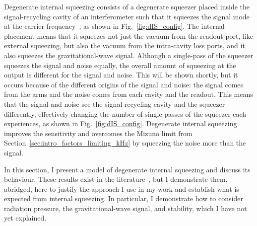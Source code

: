 Degenerate internal squeezing consists of a degenerate squeezer placed inside the signal-recycling cavity of an interferometer such that it squeezes the signal mode at the carrier frequency~\cite{}, as shown in Fig.~\ref{fig:dIS_config}. The internal placement means that it squeezes not just the vacuum from the readout port, like external squeezing, but also the vacuum from the intra-cavity loss ports, and it also squeezes the gravitational-wave signal. Although a single-pass of the squeezer squeezes the signal and noise equally, %
the overall amount of squeezing at the output is different for the signal and noise. This will be shown shortly, but it occurs because of the different origins of the signal and noise: the signal comes from the arms and the noise comes from each cavity and the readout. This means that the signal and noise see  the signal-recycling cavity and the squeezer differently, effectively changing the number of single-passes of the squeezer each experiences, as shown in Fig.~\ref{fig:dIS_config}. 
Degenerate internal squeezing improves the sensitivity and overcomes the Mizuno limit from Section~\ref{sec:intro_factors_limiting_kHz} by squeezing the noise more than the signal.

In this section, I present a model of degenerate internal squeezing and discuss its behaviour. These results exist in the literature~\cite{Korobko2019}, but I demonstrate them, abridged, here to justify the approach I use in my work and establish what is expected from internal squeezing. In particular, I demonstrate how to consider radiation pressure, the gravitational-wave signal, and stability, which I have not yet explained.

